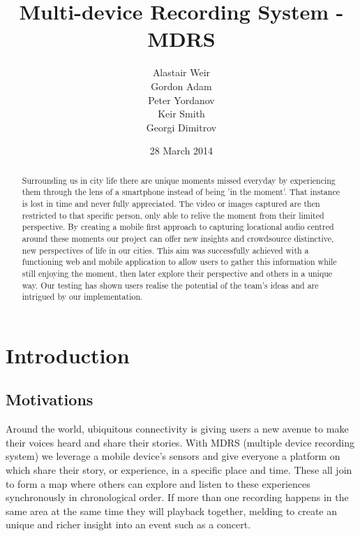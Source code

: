 \documentclass{l3proj}
\begin{document}
\setcounter{secnumdepth}{3}
\title{Multi-device Recording System - MDRS}
\author{Alastair Weir \\
        Gordon Adam \\
        Peter Yordanov \\
        Keir Smith \\
        Georgi Dimitrov}
\date{28 March 2014}
\maketitle
\begin{abstract}

Surrounding us in city life there are unique moments missed everyday by experiencing  them through the lens of a smartphone instead of being 'in the moment'. That instance is lost in time and never fully appreciated. The video or images captured are then restricted to that specific person, only able to relive the moment from their limited perspective. By creating a mobile first approach to capturing locational audio centred around these moments our project can offer new insights and crowdsource distinctive, new  perspectives of life in our cities. This aim was successfully achieved with a functioning web and mobile application to allow users to gather this information while still enjoying the moment, then later explore their perspective and others in a unique way. Our testing has shown users realise the potential of the team's ideas and are intrigued by our implementation.

\end{abstract}
\educationalconsent
\tableofcontents
\chapter{Introduction}
\label{intro}

\section{Motivations}
Around the world, ubiquitous connectivity is giving users a new avenue to make their voices heard and share their stories. With MDRS (multiple device recording system) we leverage a mobile device’s sensors and give everyone a platform on which share their story, or experience, in a specific place and time. These all join to form a map where others can explore and listen to these experiences synchronously in chronological order. If more than one recording happens in the same area at the same time they will playback together, melding to create an unique and richer insight into an event such as a concert.
\end{document}
